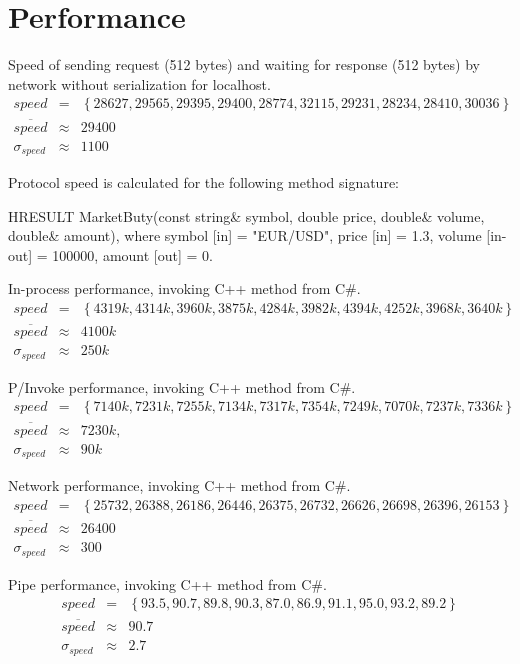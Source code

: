 \section{Performance}


Speed of sending request (512 bytes) and waiting for response (512 bytes) by network without serialization for localhost.
\begin{eqnarray}
  speed &=& \left\{28627, 29565, 29395, 29400, 28774, 32115, 29231, 28234, 28410, 30036\right\} \nonumber \\
  \overline{speed}&\approx& 29400  \nonumber \\
  \sigma_{speed} &\approx& 1100 \nonumber
\end{eqnarray}



Protocol speed is calculated for the following method signature:

HRESULT MarketButy(const string\& symbol, double price, double\& volume, double\& amount),
where symbol [in] = "EUR/USD", price [in] = 1.3, volume [in-out] = 100000, amount [out] = 0.

In-process performance, invoking C++ method from C\#.
\begin{eqnarray}
  speed &=& \left\{4319k, 4314k, 3960k, 3875k, 4284k, 3982k, 4394k, 4252k, 3968k, 3640k\right\} \nonumber \\
  \overline{speed}&\approx& 4100k  \nonumber \\
  \sigma_{speed} &\approx& 250k \nonumber
\end{eqnarray}




P/Invoke performance, invoking C++ method from C\#.
\begin{eqnarray}
  speed &=& \left\{7140k, 7231k, 7255k, 7134k, 7317k, 7354k, 7249k, 7070k, 7237k, 7336k\right\} \nonumber \\
  \overline{speed}&\approx& 7230k, \nonumber \\
  \sigma_{speed} &\approx& 90k \nonumber
\end{eqnarray}


Network performance, invoking C++ method from C\#.
\begin{eqnarray}
  speed &=& \left\{25732, 26388, 26186, 26446, 26375, 26732, 26626, 26698, 26396, 26153\right\} \nonumber \\
  \overline{speed}&\approx& 26400  \nonumber \\
  \sigma_{speed} &\approx& 300 \nonumber
\end{eqnarray}


Pipe performance, invoking C++ method from C\#.
\begin{eqnarray}
  speed &=& \left\{93.5, 90.7, 89.8, 90.3, 87.0, 86.9, 91.1, 95.0, 93.2, 89.2\right\} \nonumber \\
  \overline{speed}&\approx& 90.7  \nonumber \\
  \sigma_{speed} &\approx& 2.7 \nonumber
\end{eqnarray}
